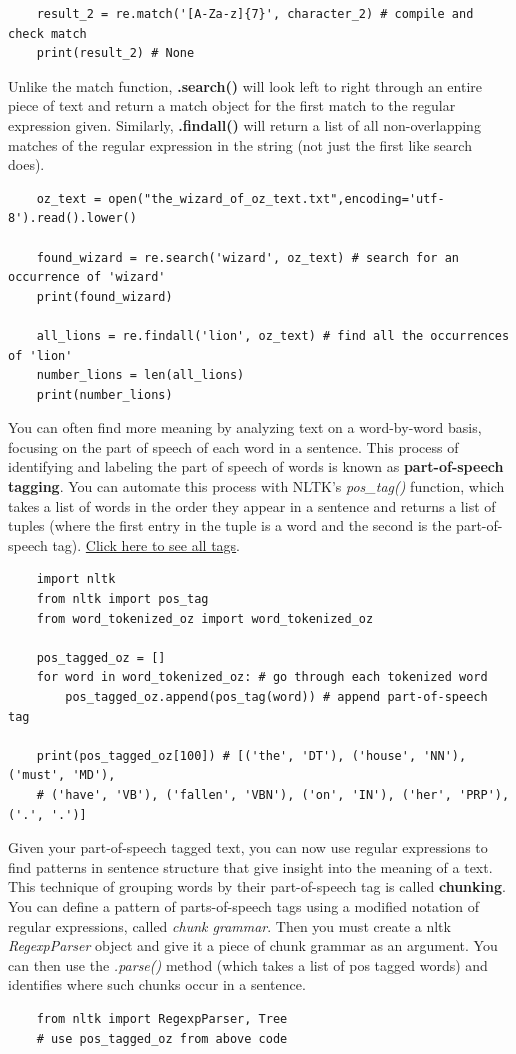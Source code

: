 \documentclass[11pt, a4paper]{article}
\begin{document}
\begin{spacing}{1.1}
\begin{lstlisting}
	result_2 = re.match('[A-Za-z]{7}', character_2) # compile and check match
	print(result_2) # None	\end{lstlisting} \vspace*{1mm}
	Unlike the match function, \textbf{.search()} will look left to right through an entire piece of text and return a match object for the first match to the regular expression given. Similarly, \textbf{.findall()} will return a list of all non-overlapping matches of the regular expression in the string (not just the first like search does). 
	\begin{lstlisting}
	oz_text = open("the_wizard_of_oz_text.txt",encoding='utf-8').read().lower()
	
	found_wizard = re.search('wizard', oz_text) # search for an occurrence of 'wizard'
	print(found_wizard)
	
	all_lions = re.findall('lion', oz_text) # find all the occurrences of 'lion'
	number_lions = len(all_lions)
	print(number_lions)	\end{lstlisting} \vspace*{1mm}
	You can often find more meaning by analyzing text on a word-by-word basis, focusing on the part of speech of each word in a sentence. This process of identifying and labeling the part of speech of words is known as \textbf{part-of-speech tagging}. You can automate this process with NLTK's \textit{pos\_tag()} function, which takes a list of words in the order they appear in a sentence and returns a list of tuples (where the first entry in the tuple is a word and the second is the part-of-speech tag). \href{https://www.ling.upenn.edu/courses/Fall_2003/ling001/penn_treebank_pos.html}{Click here to see all tags}.
	\begin{lstlisting}
	import nltk
	from nltk import pos_tag
	from word_tokenized_oz import word_tokenized_oz
		
	pos_tagged_oz = []
	for word in word_tokenized_oz: # go through each tokenized word
		pos_tagged_oz.append(pos_tag(word)) # append part-of-speech tag
	
	print(pos_tagged_oz[100]) # [('the', 'DT'), ('house', 'NN'), ('must', 'MD'), 
	# ('have', 'VB'), ('fallen', 'VBN'), ('on', 'IN'), ('her', 'PRP'), ('.', '.')]	\end{lstlisting} \newpage

	\noindent Given your part-of-speech tagged text, you can now use regular expressions to find patterns in sentence structure that give insight into the meaning of a text. This technique of grouping words by their part-of-speech tag is called \textbf{chunking}. You can define a pattern of parts-of-speech tags using a modified notation of regular expressions, called \textit{chunk grammar}. Then you must create a nltk \textit{RegexpParser} object and give it a piece of chunk grammar as an argument. You can then use the \textit{.parse()} method (which takes a list of pos tagged words) and identifies where such chunks occur in a sentence. 
	\begin{lstlisting}
	from nltk import RegexpParser, Tree
	# use pos_tagged_oz from above code
	

\end{lstlisting}
\end{spacing}
\end{document}

